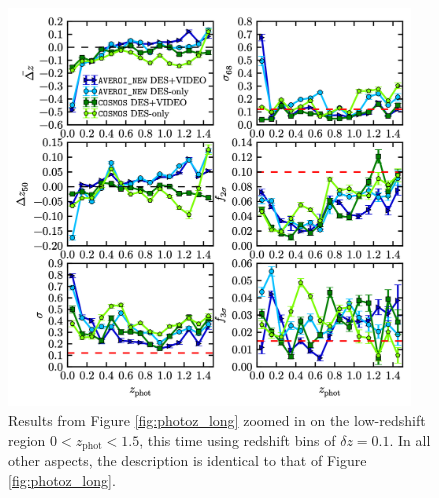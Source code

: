 \begin{figure}[!htp]
\centering
\includegraphics[width=0.95\textwidth]{Chapter3/Figs/basic_des_only_cosmos_cosmos_des_only_photz.png}
\caption[Accuracy metrics as a function of photometric redshift between \texorpdfstring{$0<z_{\mathrm{phot}}<1.5$}{}]{Results from Figure \ref{fig:photoz_long} zoomed in on the low-redshift region $0<z_{\mathrm{phot}}<1.5$, this time using redshift bins of $\delta z=0.1$. In all other aspects, the description is identical to that of Figure \ref{fig:photoz_long}.}
\label{fig:photoz}
\end{figure}

